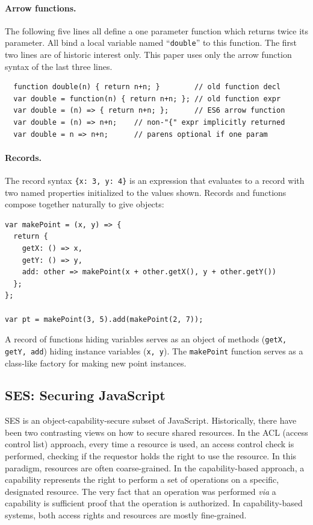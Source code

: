 \documentclass{llncs}
\begin{document}
\paragraph{Arrow functions.} 

The following five lines all define a one parameter function which returns twice its parameter. All bind a local variable named ``{\tt double}'' to this function. The first two lines are of historic interest only. This paper uses only the arrow function syntax of the last three lines.

\begin{verbatim}
  function double(n) { return n+n; }        // old function decl
  var double = function(n) { return n+n; }; // old function expr
  var double = (n) => { return n+n; };      // ES6 arrow function
  var double = (n) => n+n;    // non-"{" expr implicitly returned
  var double = n => n+n;      // parens optional if one param
\end{verbatim}

\paragraph{Records.} 

The record syntax {\tt \{x: 3, y: 4\}} is an expression that evaluates to a record with two named properties initialized to the values shown. Records and functions compose together naturally to give objects:

\begin{verbatim}
var makePoint = (x, y) => {
  return {
    getX: () => x,
    getY: () => y,
    add: other => makePoint(x + other.getX(), y + other.getY())
  };
};

var pt = makePoint(3, 5).add(makePoint(2, 7));
\end{verbatim}

A record of functions hiding variables serves as an object of methods ({\tt getX, getY, add}) hiding instance variables ({\tt x, y}). The {\tt makePoint} function serves as a class-like factory for making new point instances.


\subsection{SES: Securing JavaScript}





SES is an object-capability-secure subset of JavaScript. Historically, there have been two contrasting views on how to secure shared resources. In the ACL (access control list) approach, every time a resource is used, an access control check is performed, checking if the requestor holds the right to use the resource. In this paradigm, resources are often coarse-grained. In the capability-based approach, a capability represents the right to perform a set of operations on a specific, designated resource. The very fact that an operation was performed \emph{via} a capability is sufficient proof that the operation is authorized. In capability-based systems, both access rights and resources are mostly fine-grained.
\end{document}
